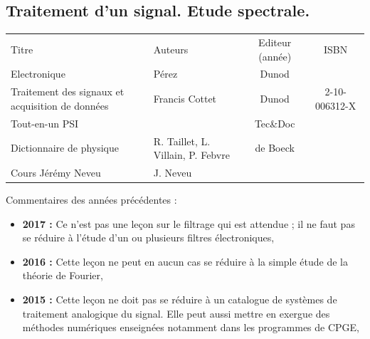 \begin{headerBlock}
  \chapter{Traitement d'un signal. Etude spectrale.}
    \label{LP_TraitementSignal}
\end{headerBlock}

\begin{center}
\begin{tabularx}{\textwidth}{| X | X | c | c |}
  \hline
  \rowcolor{gray!20}\multicolumn{4}{c}{Bibliographie de la leçon : } \\
  \hline 
  Titre & Auteurs & Editeur (année) & ISBN \\
  \hline
  Electronique & Pérez & Dunod &   \\
  \hline 
  Traitement des signaux et acquisition de données & Francis Cottet & Dunod & 2-10-006312-X \\
  \hline 
  Tout-en-un PSI &  & Tec\&Doc & \\
  \hline
  Dictionnaire de physique & R. Taillet, L. Villain, P. Febvre & de Boeck & \\
  \hline
  Cours Jérémy Neveu & J. Neveu & & \\
  \hline
\end{tabularx}
\end{center}

\begin{reportBlock}{Commentaires des années précédentes :}
    \begin{itemize}
        \item \textbf{2017 :} Ce n’est pas une leçon sur le filtrage qui est attendue ; il ne faut pas se réduire à l’étude d’un ou plusieurs filtres électroniques,
        \item \textbf{2016 :} Cette leçon ne peut en aucun cas se réduire à la simple étude de la théorie de Fourier,
        \item \textbf{2015 :} Cette leçon ne doit pas se réduire à un catalogue de systèmes de traitement analogique du signal. Elle peut aussi mettre en exergue des méthodes numériques enseignées notamment dans les programmes de CPGE, 
    \end{itemize}
\end{reportBlock}

